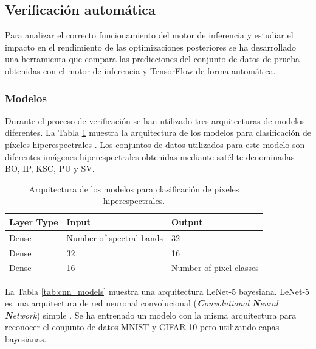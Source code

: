 \subsection{Verificación automática}

Para analizar el correcto funcionamiento del motor de inferencia y estudiar el impacto en el rendimiento de las optimizaciones posteriores se ha desarrollado una herramienta que compara las predicciones del conjunto de datos de prueba obtenidas con el motor de inferencia y TensorFlow de forma automática. 

\subsubsection{Modelos}

Durante el proceso de verificación se han utilizado tres arquitecturas de modelos diferentes. La Tabla \ref{tab:hyper_models} muestra la arquitectura de los modelos para clasificación de píxeles hiperespectrales \cite{bnn_hyper_uncertainty}. Los conjuntos de datos utilizados para este modelo son diferentes imágenes hiperespectrales obtenidas mediante satélite denominadas BO, IP, KSC, PU y SV.

\begin{table}[h]
    \centering
    \caption{Arquitectura de los modelos para clasificación de píxeles hiperespectrales.}
    \label{tab:hyper_models}
    \begin{tabular}{lll}
    \hline
         \textbf{Layer Type} & \textbf{Input} & \textbf{Output}\\ \hline
         Dense & Number of spectral bands & 32\\
         Dense & 32 & 16\\
         Dense & 16 & Number of pixel classes\\ \hline
    \end{tabular}
\end{table}

La Tabla \ref{tab:cnn_models} muestra una arquitectura LeNet-5 bayesiana. LeNet-5 es una arquitectura de red neuronal convolucional (\textit{\textbf{C}onvolutional \textbf{N}eural \textbf{N}etwork}) simple \cite{lenet}. Se ha entrenado un modelo con la misma arquitectura para reconocer el conjunto de datos MNIST \cite{MNIST_dataset} y CIFAR-10 \cite{CIFAR_dataset} pero utilizando capas bayesianas.

